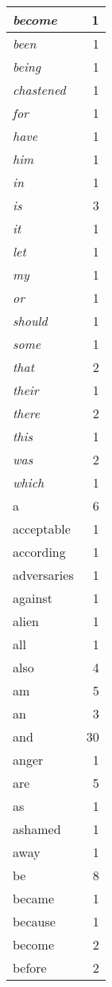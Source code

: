 \begin{center}
\begin{longtable}{l|r}
\emph{become} & 1\\ \hline 
\emph{been} & 1\\ \hline 
\emph{being} & 1\\ \hline 
\emph{chastened} & 1\\ \hline 
\emph{for} & 1\\ \hline 
\emph{have} & 1\\ \hline 
\emph{him} & 1\\ \hline 
\emph{in} & 1\\ \hline 
\emph{is} & 3\\ \hline 
\emph{it} & 1\\ \hline 
\emph{let} & 1\\ \hline 
\emph{my} & 1\\ \hline 
\emph{or} & 1\\ \hline 
\emph{should} & 1\\ \hline 
\emph{some} & 1\\ \hline 
\emph{that} & 2\\ \hline 
\emph{their} & 1\\ \hline 
\emph{there} & 2\\ \hline 
\emph{this} & 1\\ \hline 
\emph{was} & 2\\ \hline 
\emph{which} & 1\\ \hline 
a & 6\\ \hline 
acceptable & 1\\ \hline 
according & 1\\ \hline 
adversaries & 1\\ \hline 
against & 1\\ \hline 
alien & 1\\ \hline 
all & 1\\ \hline 
also & 4\\ \hline 
am & 5\\ \hline 
an & 3\\ \hline 
and & 30\\ \hline 
anger & 1\\ \hline 
are & 5\\ \hline 
as & 1\\ \hline 
ashamed & 1\\ \hline 
away & 1\\ \hline 
be & 8\\ \hline 
became & 1\\ \hline 
because & 1\\ \hline 
become & 2\\ \hline 
before & 2\\ \hline 

\end{longtable}
\end{center}
